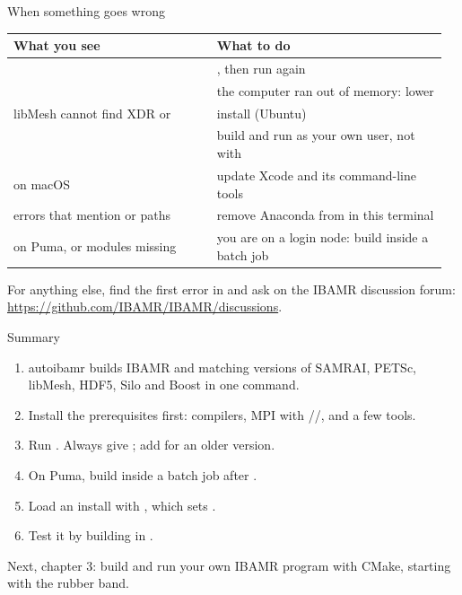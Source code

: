 \documentclass[aspectratio=169,11pt]{beamer}
\begin{document}
\begin{frame}{When something goes wrong}
\scriptsize
\begin{tabular}{@{}L{0.45\linewidth}L{0.51\linewidth}@{}}
\toprule
What you see & What to do \\
\midrule
{} & , then run again \\
 & the computer ran out of memory: lower  \\
libMesh cannot find XDR or  & install  (Ubuntu) \\
 & build and run as your own user, not with  \\
 on macOS & update Xcode and its command-line tools \\
errors that mention  or  paths & remove Anaconda from  in this terminal \\
on Puma,  or modules missing & you are on a login node: build inside a batch job \\
\bottomrule
\end{tabular}
\vspace{3mm}

\small For anything else, find the first error in  and ask on the IBAMR discussion forum: \url{https://github.com/IBAMR/IBAMR/discussions}.
\end{frame}

\begin{frame}{Summary}
\begin{enumerate}
  \item autoibamr builds IBAMR and matching versions of SAMRAI, PETSc, libMesh, HDF5, Silo and Boost in one command.
  \item Install the prerequisites first: compilers, MPI with //, and a few tools.
  \item Run . Always give ; add  for an older version.
  \item On Puma, build inside a batch job after .
  \item Load an install with , which sets .
  \item Test it by building  in .
\end{enumerate}
\vspace{3mm}
\begin{homebox}
\small Next, chapter 3: build and run your own IBAMR program with CMake, starting with the rubber band.
\end{homebox}
\end{frame}
\end{document}
